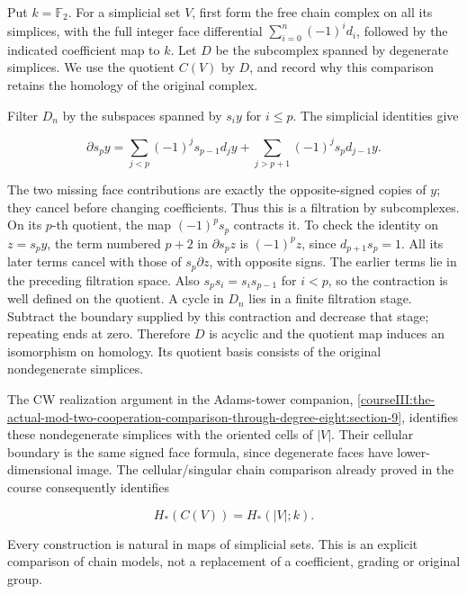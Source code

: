 Put \(k=\mathbb F_2\). For a simplicial set \(V\), first form the free chain complex on all its simplices, with the full integer face differential \(\sum_{i=0}^n(-1)^i d_i\), followed by the indicated coefficient map to \(k\). Let \(D\) be the subcomplex spanned by degenerate simplices. We use the quotient \(C(V)\) by \(D\), and record why this comparison retains the homology of the original complex.

Filter \(D_n\) by the subspaces spanned by \(s_i y\) for \(i\leq p\). The simplicial identities give

\begin{equation}
\partial s_p y
 =\sum_{j<p}(-1)^j s_{p-1}d_jy
   +\sum_{j>p+1}(-1)^j s_p d_{j-1}y.
\label{courseIII:the-actual-mod-two-cooperation-comparison-through-degree-eight:eq:1.1}
\end{equation}

The two missing face contributions are exactly the opposite-signed copies of \(y\); they cancel before changing coefficients. Thus this is a filtration by subcomplexes. On its \(p\)-th quotient, the map \((-1)^p s_p\) contracts it. To check the identity on \(z=s_p y\), the term numbered \(p+2\) in \(\partial s_pz\) is \((-1)^p z\), since \(d_{p+1}s_p=1\). All its later terms cancel with those of \(s_p\partial z\), with opposite signs. The earlier terms lie in the preceding filtration space. Also \(s_p s_i=s_i s_{p-1}\) for \(i<p\), so the contraction is well defined on the quotient. A cycle in \(D_n\) lies in a finite filtration stage. Subtract the boundary supplied by this contraction and decrease that stage; repeating ends at zero. Therefore \(D\) is acyclic and the quotient map induces an isomorphism on homology. Its quotient basis consists of the original nondegenerate simplices.

The CW realization argument in the Adams-tower companion, \cref{courseIII:the-actual-mod-two-cooperation-comparison-through-degree-eight:section-9}, identifies these nondegenerate simplices with the oriented cells of \(|V|\). Their cellular boundary is the same signed face formula, since degenerate faces have lower-dimensional image. The cellular/singular chain comparison already proved in the course consequently identifies

\begin{equation}
H_*(C(V))=H_*(|V|;k).
\label{courseIII:the-actual-mod-two-cooperation-comparison-through-degree-eight:eq:1.2}
\end{equation}

Every construction is natural in maps of simplicial sets. This is an explicit comparison of chain models, not a replacement of a coefficient, grading or original group.

